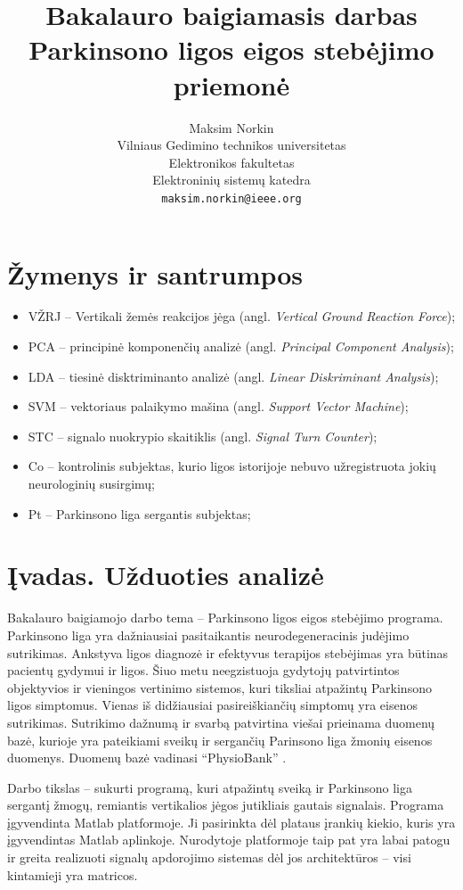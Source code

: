 \documentclass[]{vgtuef}
\author{Maksim Norkin\\Vilniaus Gedimino technikos universitetas\\Elektronikos fakultetas\\Elektroninių sistemų katedra\\\texttt{maksim.norkin@ieee.org}}
\title{Bakalauro baigiamasis darbas\\Parkinsono ligos eigos stebėjimo priemonė}
\begin{document}
\setcounter{page}{7}

\onehalfspacing


\tableofcontents

\section*{Žymenys ir santrumpos}

\begin{itemize}
\item VŽRJ -- Vertikali žemės reakcijos jėga (angl. \textit{Vertical Ground Reaction Force});
\item PCA -- principinė komponenčių analizė (angl. \textit{Principal Component Analysis});
\item LDA -- tiesinė disktriminanto analizė (angl. \textit{Linear Diskriminant Analysis});
\item SVM -- vektoriaus palaikymo mašina (angl. \textit{Support Vector Machine});
\item STC -- signalo nuokrypio skaitiklis (angl. \textit{Signal Turn Counter});
\item Co -- kontrolinis subjektas, kurio ligos istorijoje nebuvo užregistruota jokių neurologinių susirgimų;
\item Pt -- Parkinsono liga sergantis subjektas;
\end{itemize}

\section{Įvadas. Užduoties analizė}

Bakalauro baigiamojo darbo tema -- Parkinsono ligos eigos stebėjimo programa. Parkinsono liga yra dažniausiai pasitaikantis neurodegeneracinis judėjimo sutrikimas. Ankstyva ligos diagnozė ir efektyvus terapijos stebėjimas yra būtinas pacientų gydymui ir ligos. Šiuo metu neegzistuoja gydytojų patvirtintos objektyvios ir vieningos vertinimo sistemos, kuri tiksliai atpažintų Parkinsono ligos simptomus. Vienas iš didžiausiai pasireiškiančių simptomų yra eisenos sutrikimas. Sutrikimo dažnumą ir svarbą patvirtina viešai prieinama duomenų bazė, kurioje yra pateikiami sveikų ir sergančių Parinsono liga žmonių eisenos duomenys. Duomenų bazė vadinasi ``PhysioBank'' \cite{932728}.

Darbo tikslas -- sukurti programą, kuri atpažintų sveiką ir Parkinsono liga sergantį žmogų, remiantis vertikalios jėgos jutikliais gautais signalais. Programa įgyvendinta Matlab platformoje. Ji pasirinkta dėl plataus įrankių kiekio, kuris yra įgyvendintas Matlab aplinkoje. Nurodytoje platformoje taip pat yra labai patogu ir greita realizuoti signalų apdorojimo sistemas dėl jos architektūros -- visi kintamieji yra matricos. 
\end{document}
